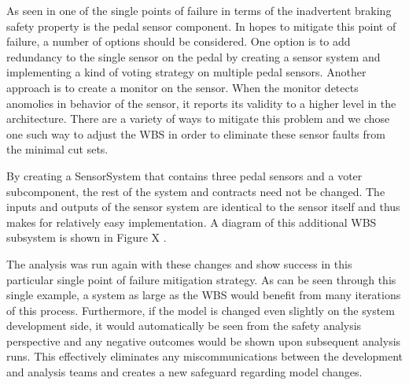 




As seen in  one of the single points of failure in terms of the inadvertent braking safety property  is the pedal sensor component. In hopes to mitigate this point of failure, a number of options should be considered. One option is to add redundancy to the single sensor on the pedal by creating a sensor system and implementing a kind of voting strategy on multiple pedal sensors. Another approach is to create a monitor on the sensor. When the monitor detects anomolies in behavior of the sensor, it reports its validity to a higher level in the architecture. There are a variety of ways to mitigate this problem and we chose one such way to adjust the WBS in order to eliminate these sensor faults from the minimal cut sets. 

By creating a SensorSystem that contains three pedal sensors and a voter subcomponent, the rest of the system and contracts need not be changed. The inputs and outputs of the sensor system are identical to the sensor itself and thus makes for relatively easy implementation. A diagram of this additional WBS subsystem is shown in Figure X .

The analysis was run again with these changes and show success in this particular single point of failure mitigation strategy. As can be seen through this single example, a system as large as the WBS would benefit from many iterations of this process. Furthermore, if the model is changed even slightly on the system development side, it would automatically be seen from the safety analysis perspective and any negative outcomes would be shown upon subsequent analysis runs. This effectively eliminates any miscommunications between the development and analysis teams and creates a new safeguard regarding model changes. 



